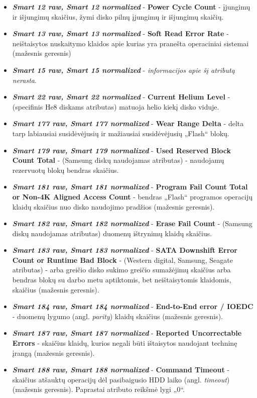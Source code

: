\documentclass{VUMIFPSkursinis}
\begin{document}
\begin{itemize}
\item \textit{\textbf{Smart 12 raw, Smart 12 normalized}} - \textbf{Power Cycle Count} - įjungimų ir išjungimų skaičius, žymi disko pilnų įjungimų ir išjungimų skaičių.
\item \textit{\textbf{Smart 13 raw, Smart 13 normalized}} - \textbf{Soft Read Error Rate} - neištaisytos nuskaitymo klaidos apie kurias yra pranešta operaciniai sistemai (mažesnis geresnis)
\item \textit{\textbf{Smart 15 raw, Smart 15 normalized}} - \textit{informacijos apie šį atributą nerasta}.
\item \textit{\textbf{Smart 22 raw, Smart 22 normalized}} - \textbf{Current Helium Level} - (specifinis He8 diskams atributas) matuoja helio kiekį disko viduje.
\item \textit{\textbf{Smart 177 raw, Smart 177 normalized}} - \textbf{Wear Range Delta} - delta tarp labiausiai susidėvėjusių ir mažiausiai susidėvėjusių „Flash“ blokų.
\item \textit{\textbf{Smart 179 raw, Smart 179 normalized}} - \textbf{Used Reserved Block Count Total} - (Samsung diskų naudojamas atributas) - naudojamų rezervuotų blokų bendras skaičius.
\item \textit{\textbf{Smart 181 raw, Smart 181 normalized}} - \textbf{Program Fail Count Total or Non-4K Aligned Access Count} - bendras „Flash“ programos operacijų klaidų skaičius nuo disko naudojimo pradžios (mažesnis geresnis).
\item \textit{\textbf{Smart 182 raw, Smart 182 normalized}} - \textbf{Erase Fail Count} - (Samsung diskų naudojamas atributas) duomenų ištrynimų klaidų skaičius.
\item \textit{\textbf{Smart 183 raw, Smart 183 normalized}} - \textbf{SATA Downshift Error Count or Runtime Bad Block} - (Western digital, Samsung, Seagate atributas) - arba greičio disko sukimo greičio sumažėjimų skaičius arba bendras blokų su darbo metu aptiktomis, bet neištaisytomis klaidomis, skaičius (mažesnis geresnis).
\item \textit{\textbf{Smart 184 raw, Smart 184 normalized}} - \textbf{End-to-End error / IOEDC} - duomenų lygumo (angl. \textit{parity}) klaidų skaičius (mažesnis geresnis).
\item \textit{\textbf{Smart 187 raw, Smart 187 normalized}} - \textbf{Reported Uncorrectable Errors} - skaičius klaidų, kurios negali būti ištaisytos naudojant techninę įrangą (mažesnis geresnis).
\item \textit{\textbf{Smart 188 raw, Smart 188 normalized}} - \textbf{Command Timeout} - skaičius atšauktų operacijų dėl pasibaigusio HDD laiko (angl. \textit{timeout}) (mažesnis geresnis). Paprastai atributo reikšmė lygi „0“.

\end{itemize}
\end{document}
